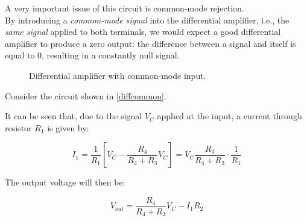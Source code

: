 \documentclass[../main.tex]{subfiles}
\begin{document}
A very important issue of this circuit is common-mode rejection.\\

By introducing a \textit{common-mode signal} into the differential amplifier, i.e., the \textit{same signal} applied to both terminals, we would expect a good differential amplifier to produce a zero output: the difference between a signal and itself is equal to 0, resulting in a constantly null signal.


\begin{figure}[h!]
\begin{center}


\caption{Differential amplifier with common-mode input.}	
\label{diffcommon}
\end{center}	
\end{figure}

Consider the circuit shown in \autoref{diffcommon}.

It can be seen that, due to the signal $V_C$ applied at the input, a current through resistor $R_1$ is given by:

\begin{equation}
	I_1 = \frac{1}{R_1} \left[ V_C - \frac{R_4}{R_4 + R_3} V_C \right] = V_C \frac{R_3}{R_4 + R_3} \cdot \frac{1}{R_1}
\end{equation}

The output voltage will then be:

\begin{equation}
	V_{out} = \frac{R_4}{R_4 + R_3} V_C - I_1R_2
\end{equation}
\end{document}
